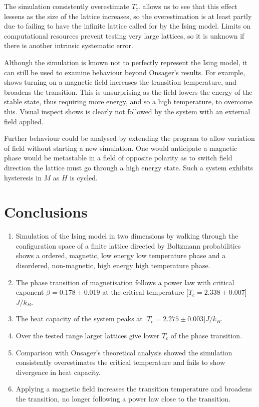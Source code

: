 \documentclass[12pt,a4paper,english]{article}
\begin{document}
The simulation consistently overestimate $T_c$.  allows us to see that this effect lessens as the size of the lattice increases, so the overestimation is at least partly due to failing to have the infinite lattice called for by the Ising model. Limits on computational resources prevent testing very large lattices, so it is unknown if there is another intrinsic systematic error.

Although the simulation is known not to perfectly represent the Ising model, it can still be used to examine behaviour beyond Onsager's results.  For example,  shows turning on a magnetic field increases the transition temperature, and broadens the transition.  This is unsurprising as the field lowers the energy of the stable state, thus requiring more energy, and so a high temperature, to overcome this.  Visual inspect shows  is clearly not followed by the system with an external field applied.

Further behaviour could be analysed by extending the program to allow variation of field without starting a new simulation.  One would anticipate a magnetic phase would be metastable in a field of opposite polarity as to switch field direction the lattice must go through a high energy state.  Such a system exhibits hysteresis in $M$ as $H$ is cycled.

\section{Conclusions}
\label{sec:conclusions}

\begin{enumerate}
\item Simulation of the Ising model in two dimensions by walking through the configuration space of a finite lattice directed by Boltzmann probabilities shows a ordered, magnetic, low energy low temperature phase and a disordered, non-magnetic, high energy high temperature phase.
\item The phase transition of magnetisation follows a power law with critical exponent $\beta=0.178\pm0.019$ at the critical temperature \unit[$T_c=2.338\pm0.007$]{$J/k_B$}.
\item The heat capacity of the system peaks at \unit[$T_c=2.275\pm0.003$]{$J/k_B$}.
\item Over the tested range larger lattices give lower $T_c$ of the phase transition.
\item Comparison with Onsager's theoretical analysis showed the simulation consistently overestimates the critical temperature and fails to show divergence in heat capacity.
\item Applying a magnetic field increases the transition temperature and broadens the transition, no longer following a power law close to the transition.
\end{enumerate}
\end{document}
